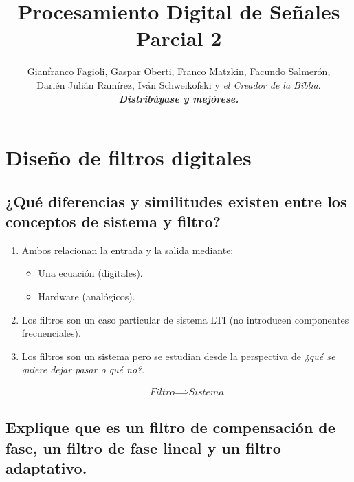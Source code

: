\documentclass[a4paper,10pt,spanish,oneside]{article}
\title{\Huge\usefont{T1}{lmss}{b}{n} Procesamiento Digital de Señales\\
Parcial 2}
\author{Gianfranco Fagioli, Gaspar Oberti, Franco Matzkin, Facundo Salmerón, \\
		Darién Julián Ramírez, Iván Schweikofski y \textit{el Creador de la Bíblia}. 						\vspace{1em}\\ 
		\textbf{\textit{Distribúyase y mejórese.}}}
\date{\vspace{-5ex}}
\begin{document}
\maketitle %

\tableofcontents

\newpage

\section{Diseño de filtros digitales}

\subsection{¿Qué diferencias y similitudes existen entre los conceptos de sistema y filtro?}

\begin{enumerate}[1.]
\item Ambos relacionan la entrada y la salida mediante:

	\begin{itemize}
	\item Una ecuación (digitales).
	\item Hardware (analógicos).
	\end{itemize}
	
\item Los filtros son un caso particular de sistema LTI (no introducen componentes frecuenciales).

\item Los filtros son un sistema pero se estudian desde la perspectiva de \textit{¿qué se quiere dejar pasar o qué no?}.

\begin{align*}
\textit{Filtro}\implies\textit{Sistema}
\end{align*}

\end{enumerate}

\vspace{1em}

\subsection{Explique que es un filtro de compensación de fase, un filtro de fase lineal y un filtro adaptativo.}
\end{document}
